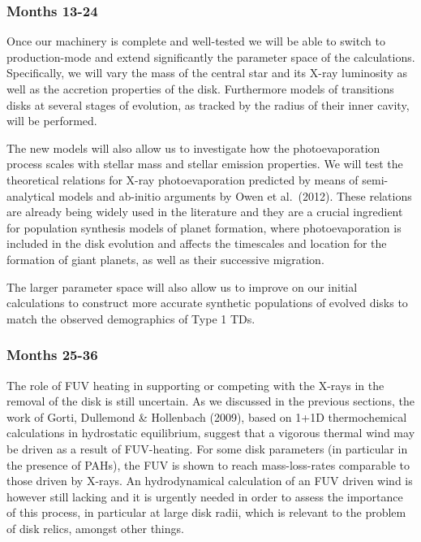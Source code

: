 \documentclass[10pt,fleqn,twoside]{article}
\begin{document}
\subsubsection{Months 13-24}

Once our machinery is complete and well-tested we will be able to
switch to production-mode and extend significantly the parameter space
of the calculations. Specifically, we will vary the mass of the central star and its X-ray
luminosity as well as the accretion properties of the
disk. Furthermore models of transitions disks at several stages 
of evolution, as tracked by the radius of their inner cavity, will be
performed. 


The new models will also allow us to investigate how
the photoevaporation process scales with stellar mass and stellar emission
properties. We will test the theoretical relations for X-ray photoevaporation 
predicted by means of semi-analytical models and ab-initio arguments
by Owen et al.\ (2012). These relations are already being widely used in
the literature and they are a crucial ingredient for population
synthesis models of planet formation, where photoevaporation is
included in the disk evolution and affects the timescales and location for
the formation of giant planets, as well as their successive
migration. 

The larger parameter space will also allow us to improve on our
initial calculations to construct more accurate synthetic
populations of evolved disks to match
the observed demographics of Type 1 TDs.  \\

\subsubsection{Months 25-36} 
The role of FUV heating in supporting or competing with the X-rays in
the removal of the disk is still uncertain. As we discussed in the
previous sections, the work of Gorti, Dullemond \& Hollenbach
(2009), based on 1+1D thermochemical calculations in hydrostatic
equilibrium, suggest that a vigorous thermal wind may be driven as a
result of FUV-heating. For some disk parameters (in particular in the
presence of PAHs), the FUV is shown to reach mass-loss-rates
comparable to those driven by X-rays. An hydrodynamical calculation of
an FUV driven wind is however still lacking and it is urgently needed
in order to assess the importance of this process, in particular at
large disk radii, which is relevant to the problem of disk relics,
amongst other things. 
\end{document}
